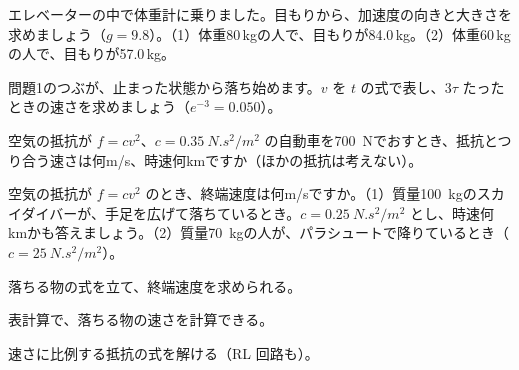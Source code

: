 
\bkproblem エレベーターの中で体重計に乗りました。目もりから、加速度の向きと大きさを求めましょう（$g=9.8$）。\newline（1）体重80\,kgの人で、目もりが84.0\,kg。\newline（2）体重60\,kgの人で、目もりが57.0\,kg。

\bkproblem 問題1のつぶが、止まった状態から落ち始めます。$v$ を $t$ の式で表し、$3\tau$ たったときの速さを求めましょう（$e^{-3}=0.050$）。

\bkproblem 空気の抵抗が $f=cv^2$、$c=\qty{0.35}{N.s^2/m^2}$ の自動車を\qty{700}{N}でおすとき、抵抗とつり合う速さは何m/s、時速何kmですか（ほかの抵抗は考えない）。

\bkproblem 空気の抵抗が $f=cv^2$ のとき、終端速度は何m/sですか。\newline（1）質量\qty{100}{kg}のスカイダイバーが、手足を広げて落ちているとき。$c=\qty{0.25}{N.s^2/m^2}$ とし、時速何kmかも答えましょう。\newline（2）質量\qty{70}{kg}の人が、パラシュートで降りているとき（$c=\qty{25}{N.s^2/m^2}$）。

\begin{furikaeri}
\begin{checklist}
\item 落ちる物の式を立て、終端速度を求められる。
\item 表計算で、落ちる物の速さを計算できる。
\item 速さに比例する抵抗の式を解ける（RL 回路も）。
\end{checklist}
\end{furikaeri}

